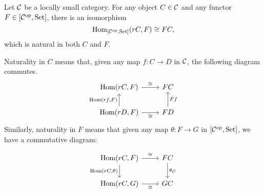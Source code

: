 \begin{lemma}[Yoneda]\label{Yoneda}
Let $\mathcal{C}$ be a locally small category. For any object $C\in\mathcal{C}$ and any functor $F\in[\mathcal{C}^{\mathrm{op}},\mathrm{Set}]$, there is an isomorphism 
\[
\operatorname{Hom}_{[\mathcal{C}^{\mathrm{op}},\mathrm{Set}]}(rC,F)\cong FC,
\]which is natural in both $C$ and $F$.
\end{lemma}

\begin{remark}
Naturality in $C$ means that, given any map $f:C\to D$ in $\mathcal{C}$, the following diagram commutes.
\[\begin{tikzcd}
\Hom(rC,F)\arrow{r}{\cong} & FC\\
\Hom(rD,F)\arrow{u}{\Hom(rf,F)}\arrow{r}[swap]{\cong} & FD\arrow{u}[swap]{Ff}
\end{tikzcd}\]
Similarly, naturality in $F$ means that given any map $\theta:F\to G$ in $[\mathcal{C}^{\mathrm{op}},\mathrm{Set}]$, we have a commutative diagram:
\end{remark}
\[\begin{tikzcd}
\Hom(rC,F)\arrow{r}{\cong}\arrow{d}[swap]{\Hom(rC,\theta)} & FC\arrow{d}{\theta_C}\\
\Hom(rC,G)\arrow{r}[swap]{\cong} & GC
\end{tikzcd}\]

